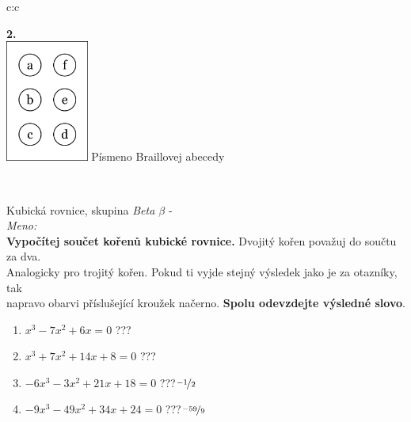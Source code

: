\documentclass[10pt]{report}
\begin{document}
\begin{tabular}{c:c}
\begin{minipage}[c][99mm][t]{0.49\linewidth}
\begin{center}
\begin{minipage}{0.77\linewidth}
\begin{center}
\end{center}
\end{minipage}
\begin{minipage}{0.20\linewidth}
\begin{center}
{\Huge\bfseries 2.} \\[2mm]
\includegraphics[height=40mm]{../images/braille.png}
{\small Písmeno Braillovej abecedy}
\end{center}
\end{minipage}
\end{center}
\end{minipage}
\\ \hdashline
\begin{minipage}[c][99mm][t]{0.49\linewidth}
\begin{center}
\vspace{7mm}
{\huge Kubická rovnice, skupina \textit{Beta $\beta$} -}\\[4.5mm]
\textit{Meno:}\phantom{xxxxxxxxxxxxxxxxxxxxxxxxxxxxxxxxxxxxxxxxxxxxxxxxxxxxxxxxxxxxxxxxx}\\[3.5mm]
\textbf{Vypočítej součet kořenů kubické rovnice.} Dvojitý kořen považuj do součtu za dva.\\Analogicky pro trojitý kořen. Pokud ti vyjde stejný výsledek jako je za otazníky, tak\\napravo obarvi příslušející kroužek načerno. \textbf{Spolu odevzdejte výsledné slovo}.\\[3mm]
\begin{minipage}{0.77\linewidth}
\begin{center}
\begin{varwidth}{\textwidth}
\begin{enumerate}
\large
\item $x^3-7x^2+6x=0$\quad \dotfill\; ???\;\dotfill {}
\item $x^3+7x^2+14x+8=0$\quad \dotfill\; ???\;\dotfill {}
\item $-6x^3-3x^2+21x+18=0$\quad \dotfill\; ???\;\dotfill \quad $\nicefrac{-1}{2}$
\item $-9x^3-49x^2+34x+24=0$\quad \dotfill\; ???\;\dotfill \quad $\nicefrac{-59}{9}$

\end{enumerate}
\end{varwidth}
\end{center}
\end{minipage}
\end{center}
\end{minipage}
\end{tabular}
\end{document}
